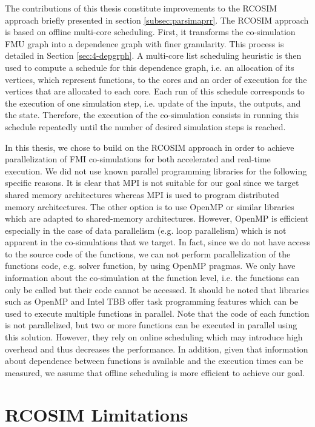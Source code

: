 The contributions of this thesis constitute improvements to the RCOSIM approach briefly presented in section \ref{subsec:parsimaprr}. The RCOSIM approach is based on offline multi-core scheduling. First, it transforms the co-simulation FMU graph into a dependence graph with finer granularity. This process is detailed in Section \ref{sec:4-depgrph}. A multi-core list scheduling heuristic is then used to compute a schedule for this dependence graph, i.e. an allocation of its vertices, which represent functions, to the cores and an order of execution for the vertices that are allocated to each core. Each run of this schedule corresponds to the execution of one simulation step, i.e. update of the inputs, the outputs, and the state. Therefore, the execution of the co-simulation consists in running this schedule repeatedly until the number of desired simulation steps is reached.

In this thesis, we chose to build on the RCOSIM approach in order to achieve parallelization of FMI co-simulations for both accelerated and real-time execution. We did not use known parallel programming libraries for the following specific reasons. It is clear that MPI is not suitable for our goal since we target shared memory architectures whereas MPI is used to program distributed memory architectures. The other option is to use OpenMP or similar libraries which are adapted to shared-memory architectures. However, OpenMP is efficient especially in the case of data parallelism (e.g. loop parallelism) which is not apparent in the co-simulations that we target. In fact, since we do not have access to the source code of the functions, we can not perform parallelization of the functions code, e.g. solver function, by using OpenMP pragmas. We only have information about the co-simulation at the function level, i.e. the functions can only be called but their code cannot be accessed. It should be noted that libraries such as OpenMP and Intel TBB offer task programming features which can be used to execute multiple functions in parallel. Note that the code of each function is not parallelized, but two or more functions can be executed in parallel using this solution. However, they rely on online scheduling which may introduce high overhead and thus decreases the performance. In addition, given that information about dependence between functions is available and the execution times can be measured, we assume that offline scheduling is more efficient to achieve our goal.   

\section{RCOSIM Limitations}

